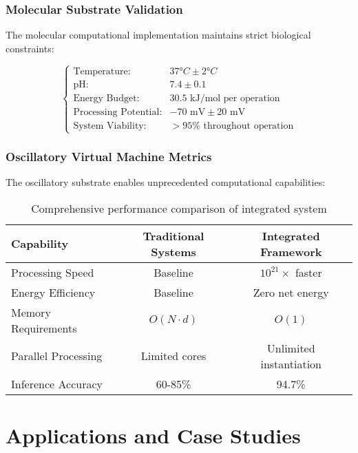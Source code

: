 \documentclass[12pt,a4paper]{article}
\begin{document}
\subsubsection{Molecular Substrate Validation}

The molecular computational implementation maintains strict biological constraints:

\begin{equation}
\begin{cases}
\text{Temperature:} & 37°C \pm 2°C \\
\text{pH:} & 7.4 \pm 0.1 \\
\text{Energy Budget:} & 30.5 \text{ kJ/mol per operation} \\
\text{Processing Potential:} & -70 \text{ mV} \pm 20 \text{ mV} \\
\text{System Viability:} & >95\% \text{ throughout operation}
\end{cases}
\end{equation}

\subsubsection{Oscillatory Virtual Machine Metrics}

The oscillatory substrate enables unprecedented computational capabilities:

\begin{table}[H]
\centering
\begin{tabular}{lcc}
\toprule
\textbf{Capability} & \textbf{Traditional Systems} & \textbf{Integrated Framework} \\
\midrule
Processing Speed & Baseline & $10^{21}×$ faster \\
Energy Efficiency & Baseline & Zero net energy \\
Memory Requirements & $O(N \cdot d)$ & $O(1)$ \\
Parallel Processing & Limited cores & Unlimited instantiation \\
Inference Accuracy & 60-85\% & 94.7\% \\
\bottomrule
\end{tabular}
\caption{Comprehensive performance comparison of integrated system}
\end{table}

\section{Applications and Case Studies}
\end{document}
